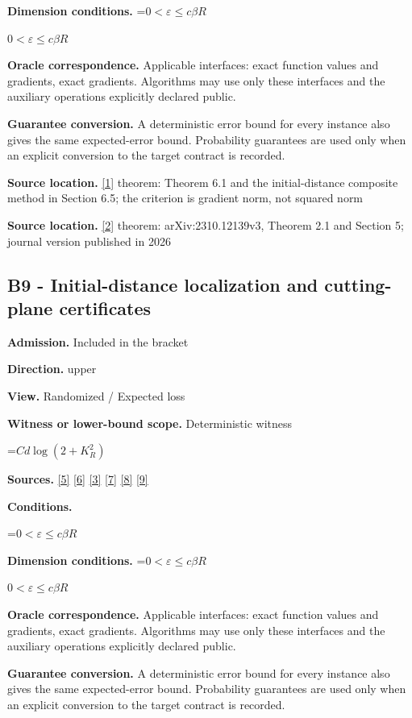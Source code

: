 \documentclass[10pt,a4paper]{article}
\newcommand{\AtlasMath}[1]{\par\begingroup\centering\setbox0=\hbox{$\displaystyle #1$}\ifdim\wd0>1.4\linewidth\typeout{ATLAS WIDE FORMULA: \the\wd0}\fi\ifdim\wd0>\linewidth\resizebox{\linewidth}{!}{\box0}\else\box0\fi\par\endgroup}
\newcommand{\AtlasInlineMath}[1]{\begingroup\setbox0=\hbox{$#1$}\ifdim\wd0>.4\linewidth\endgroup\AtlasMath{#1}\else\endgroup$#1$\fi}
\begin{document}
\textbf{Dimension conditions.} \AtlasInlineMath{0<\varepsilon\le c\beta R}

\textbf{Oracle correspondence.} Applicable interfaces: exact function values and gradients, exact gradients. Algorithms may use only these interfaces and the auxiliary operations explicitly declared public.

\textbf{Guarantee conversion.} A deterministic error bound for every instance also gives the same expected-error bound. Probability guarantees are used only when an explicit conversion to the target contract is recorded.

\textbf{Source location.} \href{https://arxiv.org/pdf/1803.06600v4}{[1]} theorem: Theorem 6.1 and the initial-distance composite method in Section 6.5; the criterion is gradient norm, not squared norm

\textbf{Source location.} \href{https://doi.org/10.1007/s10107-026-02352-2}{[2]} theorem: arXiv:2310.12139v3, Theorem 2.1 and Section 5; journal version published in 2026

\subsection{B9 - Initial-distance localization and cutting-plane certificates}
\textbf{Admission.} Included in the bracket

\textbf{Direction.} upper

\textbf{View.} Randomized / Expected loss

\textbf{Witness or lower-bound scope.} Deterministic witness

\AtlasMath{C d\log(2+K_R^2)}
\textbf{Sources.} \href{https://arxiv.org/pdf/2101.09740v2}{[5]} \href{https://arxiv.org/pdf/2609.33360v2}{[6]} \href{https://arxiv.org/pdf/2609.10874}{[3]} \href{https://arxiv.org/pdf/1405.4980}{[7]} \href{https://www2.isye.gatech.edu/~nemirovs/MOR_AccuracyCertificates.pdf}{[8]} \href{https://arxiv.org/pdf/2609.20701}{[9]}

\textbf{Conditions.} 
\AtlasMath{0<\varepsilon\le c\beta R}


\textbf{Dimension conditions.} \AtlasInlineMath{0<\varepsilon\le c\beta R}

\textbf{Oracle correspondence.} Applicable interfaces: exact function values and gradients, exact gradients. Algorithms may use only these interfaces and the auxiliary operations explicitly declared public.

\textbf{Guarantee conversion.} A deterministic error bound for every instance also gives the same expected-error bound. Probability guarantees are used only when an explicit conversion to the target contract is recorded.
\end{document}
